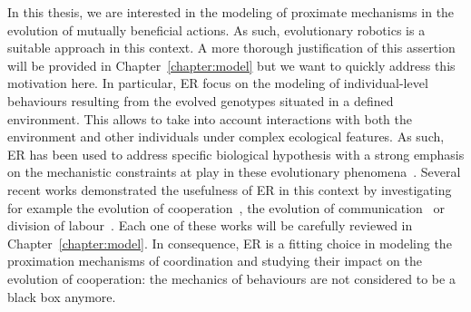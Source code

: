 

    In this thesis, we are interested in the modeling of proximate mechanisms in the evolution of mutually beneficial actions. As such, evolutionary robotics is a suitable approach in this context. A more thorough justification of this assertion will be provided in Chapter~\ref{chapter:model} but we want to quickly address this motivation here. In particular, ER focus on the modeling of individual-level behaviours resulting from the evolved genotypes situated in a defined environment. This allows to take into account interactions with both the environment and other individuals under complex ecological features. As such, ER has been used to address specific biological hypothesis with a strong emphasis on the mechanistic constraints at play in these evolutionary phenomena~\parencite{Floreano2010, Mitri2013}. Several recent works demonstrated the usefulness of ER in this context by investigating for example the evolution of cooperation~\parencite{Waibel2011, Waibel2009}, the evolution of communication~\parencite{Mitri2011, Wischmann2012} or division of labour~\parencite{Ferrante2015}. Each one of these works will be carefully reviewed in Chapter~\ref{chapter:model}. In consequence, ER is a fitting choice in modeling the proximation mechanisms of coordination and studying their impact on the evolution of cooperation: the mechanics of behaviours are not considered to be a black box anymore.

